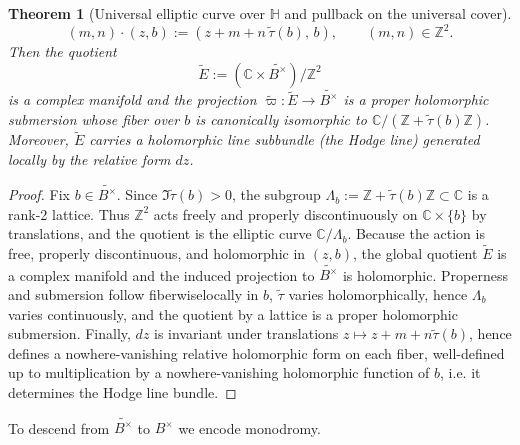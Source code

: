 \documentclass[11pt]{article}
\newtheorem{theorem}{Theorem}[section]
\theoremstyle{remark}
\begin{document}
{\begin{theorem}[Universal elliptic curve over $\mathbb{H}$ and pullback on the universal cover]
\begin{equation}
(m,n)\cdot(z,b) := (z+m+n\,\widetilde{\tau}(b),\, b),\qquad (m,n)\in\mathbb{Z}^2.
\end{equation}
Then the quotient
\begin{equation}
\widetilde{E} := (\mathbb{C}\times \widetilde{B^{\times}})/\mathbb{Z}^2
\end{equation}
is a complex manifold and the projection $\widetilde{\varpi}:\widetilde{E}\to \widetilde{B^{\times}}$ is a proper holomorphic submersion
whose fiber over $b$ is canonically isomorphic to $\mathbb{C}/(\mathbb{Z}+\widetilde{\tau}(b)\mathbb{Z})$.
Moreover, $\widetilde{E}$ carries a holomorphic line subbundle (the Hodge line) generated locally by the relative form $dz$.
\end{theorem}

\begin{proof}
Fix $b\in \widetilde{B^{\times}}$. Since $\Im\widetilde{\tau}(b)>0$, the subgroup
$\Lambda_b:=\mathbb{Z}+\widetilde{\tau}(b)\mathbb{Z}\subset\mathbb{C}$ is a rank-2 lattice.
Thus $\mathbb{Z}^2$ acts freely and properly discontinuously on $\mathbb{C}\times\{b\}$ by translations,
and the quotient is the elliptic curve $\mathbb{C}/\Lambda_b$.
Because the action is free, properly discontinuous, and holomorphic in $(z,b)$, the global quotient
$\widetilde{E}$ is a complex manifold and the induced projection to $\widetilde{B^{\times}}$ is holomorphic.
Properness and submersion follow fiberwise\:locally in $b$, $\widetilde{\tau}$ varies holomorphically, hence
$\Lambda_b$ varies continuously, and the quotient by a lattice is a proper holomorphic submersion.
Finally, $dz$ is invariant under translations $z\mapsto z+m+n\widetilde{\tau}(b)$, hence defines a nowhere-vanishing
relative holomorphic form on each fiber, well-defined up to multiplication by a nowhere-vanishing holomorphic function of $b$,
i.e. it determines the Hodge line bundle.
\end{proof}

To descend from $\widetilde{B^{\times}}$ to $B^{\times}$ we encode monodromy.

}
\end{document}
